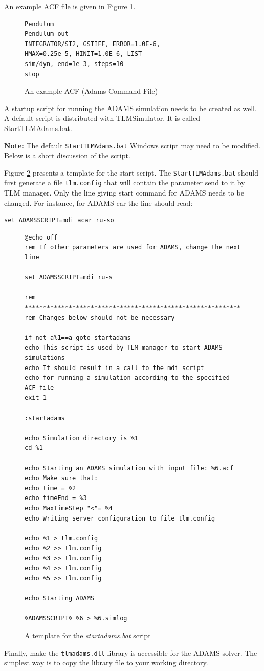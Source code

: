 An example ACF file is given in Figure \ref{figACFEx}.
\begin{figure}[h]
\small{
\begin{verbatim}
Pendulum
Pendulum_out
INTEGRATOR/SI2, GSTIFF, ERROR=1.0E-6,
HMAX=0.25e-5, HINIT=1.0E-6, LIST
sim/dyn, end=1e-3, steps=10
stop
\end{verbatim}
}
\caption{An example ACF (Adams Command File)\label{figACFEx}}
\end{figure}


A startup script for running the ADAMS simulation needs to be created as well. 
A default script is distributed with TLMSimulator. 
It is called StartTLMAdams.bat.

{\bf Note:} The default \verb!StartTLMAdams.bat! Windows script may need to be modified. 
Below is a short discussion of the script.

Figure \ref{figStartadams} presents a template for the start script.
The \verb!StartTLMAdams.bat! should first generate a file \verb!tlm.config! that will contain the parameter send to it by TLM manager.
Only the line giving start command for ADAMS needs to be changed.
For instance, for ADAMS car the line should read:
\begin{verbatim}
set ADAMSSCRIPT=mdi acar ru-so
\end{verbatim}

\begin{figure}[h]
\small{
\begin{verbatim}
@echo off
rem If other parameters are used for ADAMS, change the next line

set ADAMSSCRIPT=mdi ru-s

rem ***************************************************************
rem Changes below should not be necessary

if not a%1==a goto startadams
echo This script is used by TLM manager to start ADAMS simulations
echo It should result in a call to the mdi script
echo for running a simulation according to the specified ACF file
exit 1

:startadams

echo Simulation directory is %1
cd %1

echo Starting an ADAMS simulation with input file: %6.acf
echo Make sure that:
echo time = %2
echo timeEnd = %3
echo MaxTimeStep "<"= %4
echo Writing server configuration to file tlm.config

echo %1 > tlm.config
echo %2 >> tlm.config
echo %3 >> tlm.config
echo %4 >> tlm.config
echo %5 >> tlm.config

echo Starting ADAMS

%ADAMSSCRIPT% %6 > %6.simlog
\end{verbatim}
}
\caption{A template for the \emph{startadams.bat} script\label{figStartadams}}
\end{figure}

Finally, make the \verb!tlmadams.dll! library is accessible for the ADAMS solver.
The simplest way is to copy the library file to your working directory.


